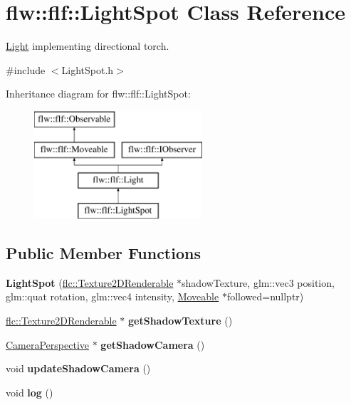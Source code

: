 \hypertarget{classflw_1_1flf_1_1LightSpot}{}\section{flw\+:\+:flf\+:\+:Light\+Spot Class Reference}
\label{classflw_1_1flf_1_1LightSpot}


\hyperlink{classflw_1_1flf_1_1Light}{Light} implementing directional torch.  




{\ttfamily \#include $<$Light\+Spot.\+h$>$}

Inheritance diagram for flw\+:\+:flf\+:\+:Light\+Spot\+:\begin{figure}[H]
\begin{center}
\leavevmode
\includegraphics[height=4.000000cm]{classflw_1_1flf_1_1LightSpot}
\end{center}
\end{figure}
\subsection*{Public Member Functions}
\begin{DoxyCompactItemize}
\item 
\mbox{\label{classflw_1_1flf_1_1LightSpot_a7f824ebd8f341ec385e3f201c6fa0b14}} 
{\bfseries Light\+Spot} (\hyperlink{classflw_1_1flc_1_1Texture2DRenderable}{flc\+::\+Texture2\+D\+Renderable} $\ast$shadow\+Texture, glm\+::vec3 position, glm\+::quat rotation, glm\+::vec4 intensity, \hyperlink{classflw_1_1flf_1_1Moveable}{Moveable} $\ast$followed=nullptr)
\item 
\mbox{\label{classflw_1_1flf_1_1LightSpot_a70b5a358f4e40246483ac6e43561c2f0}} 
\hyperlink{classflw_1_1flc_1_1Texture2DRenderable}{flc\+::\+Texture2\+D\+Renderable} $\ast$ {\bfseries get\+Shadow\+Texture} ()
\item 
\mbox{\label{classflw_1_1flf_1_1LightSpot_aa567ffe725d6f3d8ed68127b573d1d30}} 
\hyperlink{classflw_1_1flf_1_1CameraPerspective}{Camera\+Perspective} $\ast$ {\bfseries get\+Shadow\+Camera} ()
\item 
\mbox{\label{classflw_1_1flf_1_1LightSpot_acb22788e20701eb306dc4de6d4942694}} 
void {\bfseries update\+Shadow\+Camera} ()
\item 
\mbox{\label{classflw_1_1flf_1_1LightSpot_a341fffa52865761169300bc812715fe7}} 
void {\bfseries log} ()
\end{DoxyCompactItemize}
